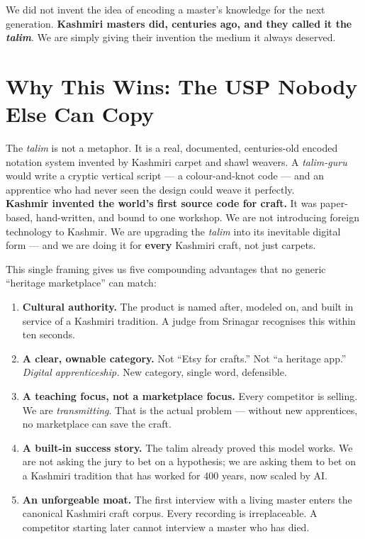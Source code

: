 \documentclass[11pt, a4paper]{article}
\begin{document}
\smallskip

We did not invent the idea of encoding a master's knowledge for the next generation. \textbf{Kashmiri masters did, centuries ago, and they called it the {\itshape talim}}. We are simply giving their invention the medium it always deserved.

\section{Why This Wins: The USP Nobody Else Can Copy}

\begin{kashmirbox}
The {\itshape talim} is not a metaphor. It is a real, documented, centuries-old encoded notation system invented by Kashmiri carpet and shawl weavers. A {\itshape talim-guru} would write a cryptic vertical script — a colour-and-knot code — and an apprentice who had never seen the design could weave it perfectly.\\[4pt]
\textbf{Kashmir invented the world's first source code for craft.} It was paper-based, hand-written, and bound to one workshop. We are not introducing foreign technology to Kashmir. We are upgrading the {\itshape talim} into its inevitable digital form — and we are doing it for {\bfseries every} Kashmiri craft, not just carpets.
\end{kashmirbox}

This single framing gives us five compounding advantages that no generic ``heritage marketplace'' can match:

\begin{enumerate}
  \item \textbf{Cultural authority.} The product is named after, modeled on, and built in service of a Kashmiri tradition. A judge from Srinagar recognises this within ten seconds.
  \item \textbf{A clear, ownable category.} Not ``Etsy for crafts.'' Not ``a heritage app.'' \textit{Digital apprenticeship.} New category, single word, defensible.
  \item \textbf{A teaching focus, not a marketplace focus.} Every competitor is selling. We are \textit{transmitting}. That is the actual problem — without new apprentices, no marketplace can save the craft.
  \item \textbf{A built-in success story.} The talim already proved this model works. We are not asking the jury to bet on a hypothesis; we are asking them to bet on a Kashmiri tradition that has worked for 400 years, now scaled by AI.
  \item \textbf{An unforgeable moat.} The first interview with a living master enters the canonical Kashmiri craft corpus. Every recording is irreplaceable. A competitor starting later cannot interview a master who has died.
\end{enumerate}
\end{document}
